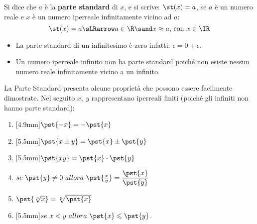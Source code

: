% 

\begin{definizione}
 Si dice che \(a\) è la \textbf{parte standard} di \(x\), e si scrive: 
 \(\st(x) = a\), se \(a\) è un numero reale e \(x\) è un numero iperreale
infinitamente vicino ad \(a\):
\[\st(x) = a \sLRarrow a \in \R \sand x \approx a\mbox{, con }x\in \IR\]
\end{definizione}
\begin{osservazione}
\begin{itemize} [nosep]
 \item 
La parte standard di un infinitesimo è zero infatti:
\(\epsilon = 0+\epsilon\).
 \item 
Un numero iperreale infinito non ha parte standard poiché non esiste nessun 
numero reale infinitamente vicino a un infinito.
\end{itemize}
\end{osservazione}
\vspace{1em}
La Parte Standard presenta alcune proprietà che possono essere facilmente 
dimostrate. Nel seguito \(x,\ y\) rappresentano iperreali finiti 
(poiché gli infiniti non hanno parte standard):

\begin{multicols}{2}
\begin{enumerate} [nosep]
 \item \raisebox{+0mm}[4.9mm]{}\(\pst{-x} = -\pst{x}\)
 \item \raisebox{+0mm}[5.5mm]{}\(\pst{x \pm y} = \pst{x} \pm \pst{y}\)
 \item \raisebox{+0mm}[5.5mm]{}\(\pst{xy} = \pst{x} \cdot \pst{y}\)
 \item \(se ~ \pst{y} \neq 0 ~ allora ~
 \pst{\frac{x}{y}} = \dfrac{\pst{x}}{\pst{y}}\)
 \item \(\pst{\sqrt[n]{x}} = \sqrt[n]{\pst{x}}\)
 \item \raisebox{+0mm}[5.5mm]{}\(se ~  x < y ~ allora ~ 
 \pst{x} \leqslant \pst{y}\).
\end{enumerate}
\end{multicols}

